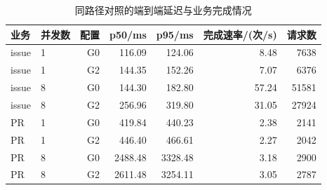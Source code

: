 \begin{table}[!htb]
\centering
\caption{同路径对照的端到端延迟与业务完成情况}
\label{tab:overhead-business-rr022}
\small
\begin{tabular}{llrrrrr}
\toprule
业务 & 并发数 & 配置 & p50/ms & p95/ms & 完成速率/(次/s) & 请求数 \\
\midrule
issue & 1 & G0 & 116.09 & 124.06 & 8.48 & 7638 \\
issue & 1 & G2 & 144.35 & 152.26 & 7.07 & 6376 \\
issue & 8 & G0 & 144.30 & 182.80 & 57.24 & 51581 \\
issue & 8 & G2 & 256.96 & 319.80 & 31.05 & 27924 \\
PR & 1 & G0 & 419.84 & 440.23 & 2.38 & 2141 \\
PR & 1 & G2 & 446.40 & 466.61 & 2.27 & 2042 \\
PR & 8 & G0 & 2488.48 & 3328.48 & 3.18 & 2900 \\
PR & 8 & G2 & 2611.48 & 3254.11 & 3.05 & 2787 \\
\bottomrule
\end{tabular}
\end{table}

